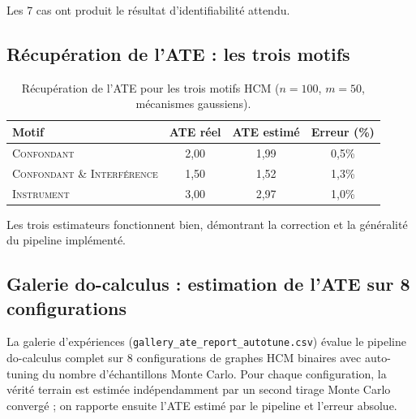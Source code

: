 \documentclass[11pt,a4paper]{article}
\begin{document}
Les 7 cas ont produit le résultat d'identifiabilité attendu.

\subsection{Récupération de l'ATE : les trois motifs}

\begin{table}[h!]
\centering
\caption{Récupération de l'ATE pour les trois motifs HCM ($n=100$, $m=50$, mécanismes gaussiens).}
\label{tab:ate_all_motifs}
\begin{tabular}{lccc}
\toprule
\textbf{Motif} & \textbf{ATE réel} & \textbf{ATE estimé} & \textbf{Erreur (\%)} \\
\midrule
\textsc{Confondant}                 & 2,00 & 1,99 & 0,5\% \\
\textsc{Confondant \& Interférence} & 1,50 & 1,52 & 1,3\% \\
\textsc{Instrument}                 & 3,00 & 2,97 & 1,0\% \\
\bottomrule
\end{tabular}
\end{table}

Les trois estimateurs fonctionnent bien, démontrant la correction et la généralité du pipeline implémenté.

\subsection{Galerie do-calculus : estimation de l'ATE sur 8 configurations}
\label{sec:gallery_ate}

La galerie d'expériences (\texttt{gallery\_ate\_report\_autotune.csv}) évalue le pipeline do-calculus complet sur 8 configurations de graphes HCM binaires avec auto-tuning du nombre d'échantillons Monte Carlo.
Pour chaque configuration, la vérité terrain est estimée indépendamment par un second tirage Monte Carlo convergé ; on rapporte ensuite l'ATE estimé par le pipeline et l'erreur absolue.
\end{document}
